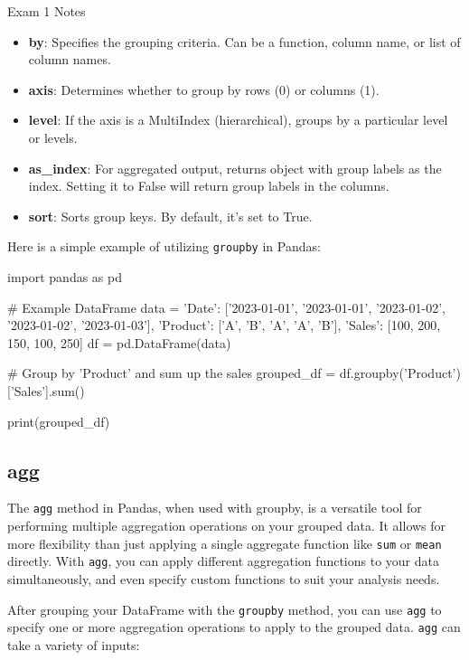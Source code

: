 \begin{examnotes}{Exam 1 Notes}
    \begin{itemize}
        \item \textbf{by}: Specifies the grouping criteria. Can be a function, column name, or list of column names.
        \item \textbf{axis}: Determines whether to group by rows (0) or columns (1).
        \item \textbf{level}: If the axis is a MultiIndex (hierarchical), groups by a particular level or levels.
        \item \textbf{as\_index}: For aggregated output, returns object with group labels as the index. Setting it to False will return group labels in the columns.
        \item \textbf{sort}: Sorts group keys. By default, it's set to True.
    \end{itemize}

    \begin{highlight}
        Here is a simple example of utilizing \texttt{groupby} in Pandas:

    \begin{code}[Python]
    import pandas as pd

    # Example DataFrame
    data = {
        'Date': ['2023-01-01', '2023-01-01', '2023-01-02', '2023-01-02', '2023-01-03'],
        'Product': ['A', 'B', 'A', 'A', 'B'],
        'Sales': [100, 200, 150, 100, 250]
    }
    df = pd.DataFrame(data)
    
    # Group by 'Product' and sum up the sales
    grouped_df = df.groupby('Product')['Sales'].sum()
    
    print(grouped_df)            
    \end{code}
    \end{highlight}

    \subsection*{agg}

    The \texttt{agg} method in Pandas, when used with groupby, is a versatile tool for performing multiple aggregation operations on your grouped data. It allows for more flexibility than just applying 
    a single aggregate function like \texttt{sum} or \texttt{mean} directly. With \texttt{agg}, you can apply different aggregation functions to your data simultaneously, and even specify custom functions 
    to suit your analysis needs.

    After grouping your DataFrame with the \texttt{groupby} method, you can use \texttt{agg} to specify one or more aggregation operations to apply to the grouped data. \texttt{agg} can take a variety 
    of inputs:


\end{examnotes}
